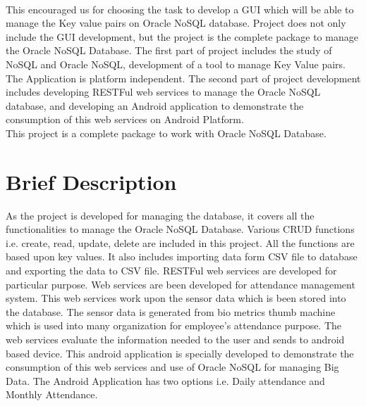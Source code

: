 \\
\hspace*{0.7in} This encouraged us for choosing the task to develop a GUI which will be able to manage the Key value pairs on Oracle NoSQL database. Project does not only include the GUI development, but the project is the complete package to manage the Oracle NoSQL Database. The first part of project includes the study of NoSQL and Oracle NoSQL, development of a tool to manage Key Value pairs. The Application is platform independent. The second part of project development includes developing RESTFul web services to manage the Oracle NoSQL database, and developing an Android application to demonstrate the consumption of this web services on Android Platform.
\\
\hspace*{0.7in} This project is a complete package to work with Oracle NoSQL Database.

\section{Brief Description}
\hspace*{0.7in} As the project is developed for managing the database, it covers all the functionalities to manage the Oracle NoSQL Database. Various CRUD functions i.e. create, read, update, delete are included in this project. All the functions are based upon key values. It also includes importing data form CSV file to database and exporting the data to CSV file. RESTFul web services are developed for particular purpose. Web services are been developed for attendance management system. This web services work upon the sensor data which is been stored into the database. The sensor data is generated from bio metrics thumb machine which is used into many organization for employee's attendance purpose. The web services evaluate the information needed to the user and sends to android based device. This android application is specially developed to demonstrate the consumption of this web services and use of Oracle NoSQL for managing Big Data. The Android Application has two options i.e. Daily attendance and Monthly Attendance.

